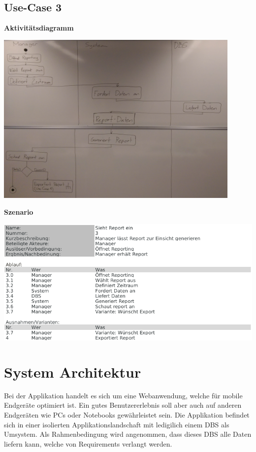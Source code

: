 \documentclass[a4paper]{scrreprt}
\begin{document}
\section{Use-Case 3}

\textbf{Aktivitätsdiagramm}

\includegraphics[width=0.9\textwidth]{uc-3_Report_einsehen/uc3_activity_diagram.png}

\pagebreak

\textbf{Szenario}

\includegraphics[width=1\textwidth]{uc-3_Report_einsehen/uc3_scenario.png}




\chapter{System Architektur}
Bei der Applikation handelt es sich um eine Webanwendung, welche für mobile Endgeräte optimiert ist. Ein gutes Benutzererlebnis soll aber auch auf anderen Endgeräten wie PCs oder Notebooks gewährleistet sein. Die Applikation befindet sich in einer isolierten Applikationslandschaft mit ledigilich einem DBS als Umsystem. Als Rahmenbedingung wird angenommen, dass dieses DBS alle Daten liefern kann, welche von Requirements verlangt werden.
\end{document}

